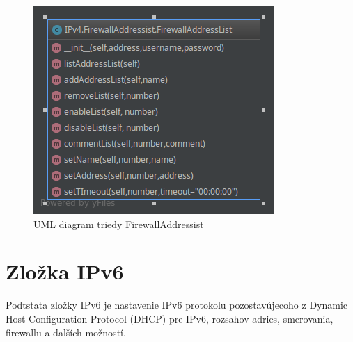 \begin{figure}[H]
\centering
\includegraphics[scale=0.6]{../text/addList.png}
\caption{UML diagram triedy FirewallAddressist}
\label{fig:addList}
\end{figure}
\section{Zložka IPv6}
Podtstata zložky IPv6 je nastavenie IPv6 protokolu pozostavújecoho z Dynamic Host Configuration Protocol (DHCP) pre IPv6, rozsahov adries, smerovania, firewallu a ďalších možností.
